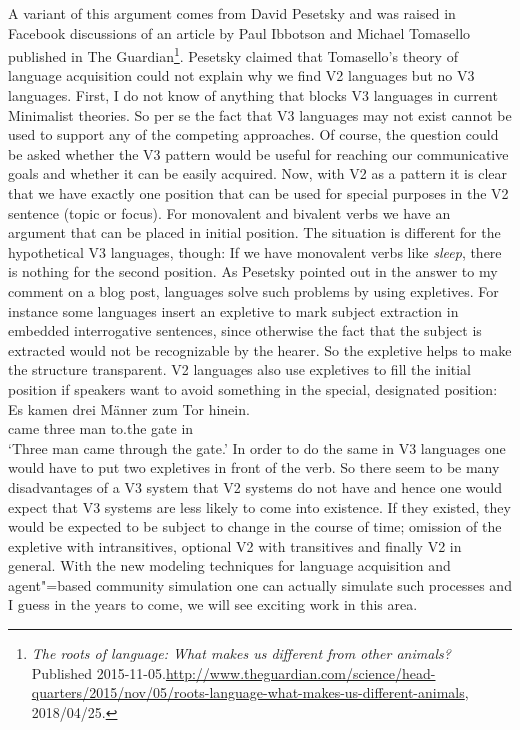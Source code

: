 A variant of this argument comes from David Pesetsky and was raised in Facebook discussions of an
article by Paul Ibbotson and Michael Tomasello
published in The Guardian\footnote{%
\emph{The roots of language: What makes us different from other animals?} Published
2015-11-05.\newline \url{http://www.theguardian.com/science/head-quarters/2015/nov/05/roots-language-what-makes-us-different-animals}, 2018/04/25.
}. 
Pesetsky claimed that Tomasello's theory of language
acquisition could not explain why we find V2 languages but no V3 languages. First, I do not know of
anything that blocks V3 languages in current Minimalist theories. So per se the fact that V3
languages may not exist cannot be used to support any of the competing approaches. Of course, the
question could be asked whether the V3 pattern would be useful for reaching our communicative goals
and whether it can be easily acquired. Now, with V2 as a pattern it is clear that we have exactly
one position that can be used for special purposes in the V2 sentence (topic or focus). For monovalent and bivalent verbs we
have an argument that can be placed in initial position. The situation is different for the
hypothetical V3 languages, though: If we have monovalent verbs like \emph{sleep}, there is nothing
for the second position. As Pesetsky pointed out in the answer to my comment on a blog post, languages solve such
problems by using expletives. For instance some languages insert an expletive to mark subject
extraction in embedded interrogative sentences, since otherwise the fact that the subject is
extracted would not be recognizable by the hearer. So the expletive helps to make the structure
transparent. V2 languages also use expletives to fill the initial position if speakers want to avoid
something in the special, designated position:
\ea
\gll Es kamen drei Männer zum Tor hinein.\\
     \expl{} came three man to.the gate in\\
\glt `Three man came through the gate.'
\z
In order to do the same in V3 languages one would have to put two expletives in front of the
verb. So there seem to be many disadvantages of a V3 system that V2 systems do not have and hence
one would expect that V3 systems are less likely to come into existence. If they existed, they would
be expected to be subject to change in the course of time; \eg omission of the expletive with
intransitives, optional V2 with transitives and finally V2 in general. With the new modeling
techniques for language acquisition and agent"=based community simulation one can actually simulate
such processes and I guess in the years to come, we will see exciting work in this area. 

